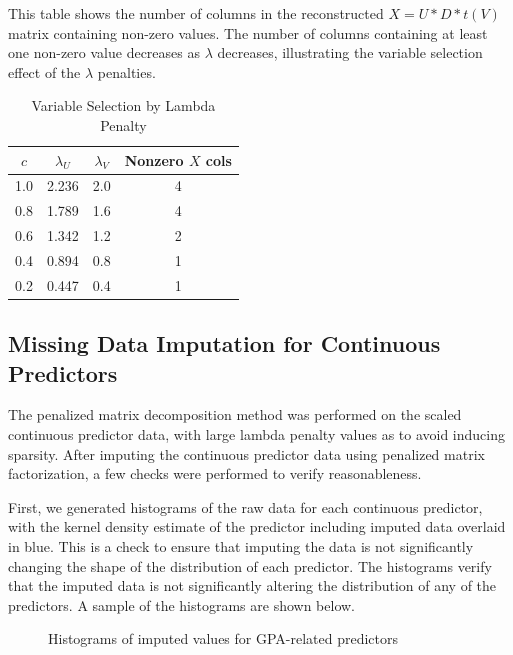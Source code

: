 \documentclass{article}
\begin{document}
This table shows the number of columns in the reconstructed $X = U*D*t(V)$ matrix containing non-zero values.  The number of columns containing at least one non-zero value decreases as $\lambda$ decreases, illustrating the variable selection effect of the $\lambda$ penalties.

\begin{table}[H]
  \caption{Variable Selection by Lambda Penalty}
  \label{sample-table}
  \centering
  \begin{tabular}{cccc}
    \toprule
    $c$   & $\lambda_U$   & $\lambda_V$   &Nonzero $X$ cols \\
    \midrule
    1.0  & 2.236     & 2.0       & 4\\
    0.8  & 1.789     & 1.6       & 4\\
    0.6  & 1.342     & 1.2       & 2\\
    0.4  & 0.894     & 0.8       & 1\\
    0.2  & 0.447     & 0.4       & 1\\
    \bottomrule
  \end{tabular}
\end{table}

\subsection{Missing Data Imputation for Continuous Predictors}

The penalized matrix decomposition method was performed on the scaled continuous predictor data, with large lambda penalty values as to avoid inducing sparsity.  After imputing the continuous predictor data using penalized matrix factorization, a few checks were performed to verify reasonableness.

First, we generated histograms of the raw data for each continuous predictor, with the kernel density estimate of the predictor including imputed data overlaid in blue.  This is a check to ensure that imputing the data is not significantly changing the shape of the distribution of each predictor. The histograms verify that the imputed data is not significantly altering the distribution of any of the predictors.  A sample of the histograms are shown below.

\begin{figure}[htp!]
  \centering
  \caption{Histograms of imputed values for GPA-related predictors \label{fig:1}}
\end{figure}
\end{document}
